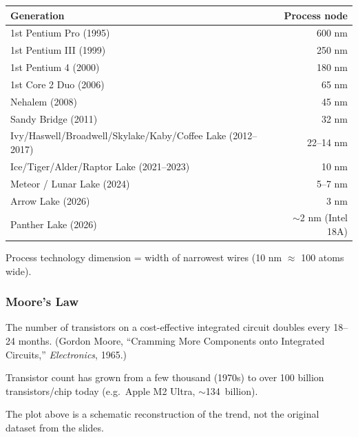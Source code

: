 \begin{center}
\begin{tabular}{@{}lr@{}}
\toprule
Generation & Process node \\
\midrule
1st Pentium Pro (1995) & 600 nm \\
1st Pentium III (1999) & 250 nm \\
1st Pentium 4 (2000)   & 180 nm \\
1st Core 2 Duo (2006)  & 65 nm \\
Nehalem (2008)         & 45 nm \\
Sandy Bridge (2011)    & 32 nm \\
Ivy/Haswell/Broadwell/Skylake/Kaby/Coffee Lake (2012--2017) & 22--14 nm \\
Ice/Tiger/Alder/Raptor Lake (2021--2023) & 10 nm \\
Meteor / Lunar Lake (2024) & 5--7 nm \\
Arrow Lake (2026)      & 3 nm \\
Panther Lake (2026)    & $\sim$2 nm (Intel 18A) \\
\bottomrule
\end{tabular}
\end{center}
Process technology dimension = width of narrowest wires (10 nm $\approx$ 100
atoms wide).

\subsubsection{Moore's Law}
\begin{definition}
The number of transistors on a cost-effective integrated circuit doubles
every 18--24 months. (Gordon Moore, ``Cramming More Components onto
Integrated Circuits,'' \emph{Electronics}, 1965.)
\end{definition}
Transistor count has grown from a few thousand (1970s) to over 100 billion
transistors/chip today (e.g.\ Apple M2 Ultra, $\sim$134~billion).

\begin{center}
\end{center}
\begin{remark}
The plot above is a schematic reconstruction of the trend, not the original
dataset from the slides.
\end{remark}

